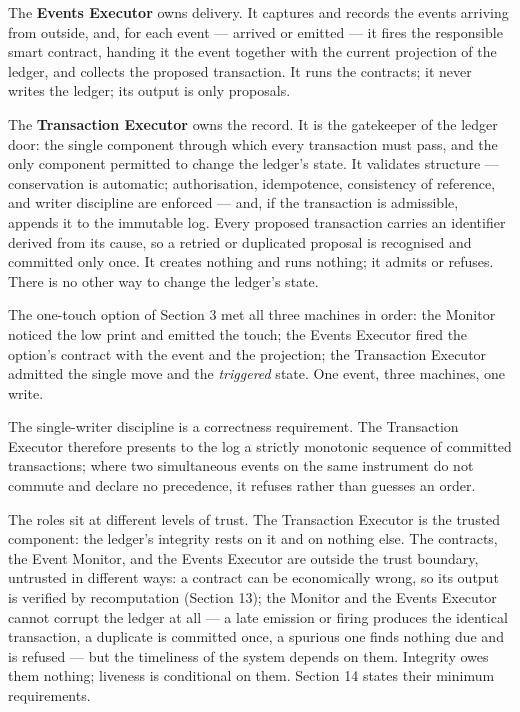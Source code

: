 \documentclass[11pt,a4paper]{article}
\newcommand{\clabel}[1]{\leavevmode\hypertarget{clause-#1}{}%
  \marginpar{\raggedright\scriptsize\ttfamily\textcolor{gray}{#1}}}
\begin{document}
\clabel{C-5.4}The \textbf{Events Executor} owns delivery. It captures and records the
events arriving from outside, and, for each event --- arrived or emitted
--- it fires the responsible smart contract, handing it the event
together with the current projection of the ledger, and collects the
proposed transaction. It runs the contracts; it never writes the ledger;
its output is only proposals.

\clabel{C-5.5}The \textbf{Transaction Executor} owns the record. It is the gatekeeper
of the ledger door: the single component through which every transaction
must pass, and the only component permitted to change the ledger's
state. It validates structure --- conservation is automatic;
authorisation, idempotence, consistency of reference, and writer
discipline are enforced --- and, if the transaction is admissible,
appends it to the immutable log. \clabel{C-5.6}Every proposed transaction carries an
identifier derived from its cause, so a retried or duplicated proposal
is recognised and committed only once. It creates nothing and runs
nothing; it admits or refuses. There is no other way to change the
ledger's state.

The one-touch option of Section 3 met all three machines in order: the
Monitor noticed the low print and emitted the touch; the Events Executor
fired the option's contract with the event and the projection; the
Transaction Executor admitted the single move and the \emph{triggered}
state. One event, three machines, one write.

\clabel{C-5.7}The single-writer discipline is a correctness requirement. The
Transaction Executor therefore presents to the log a strictly monotonic
sequence of committed transactions; where two simultaneous events on the
same instrument do not commute and declare no precedence, it refuses
rather than guesses an order.

\clabel{C-5.8}The roles sit at different levels of trust. The Transaction Executor is
the trusted component: the ledger's integrity rests on it and on nothing
else. The contracts, the Event Monitor, and the Events Executor are
outside the trust boundary, untrusted in different ways: a contract can
be economically wrong, so its output is verified by recomputation
(Section 13); the Monitor and the Events Executor cannot corrupt the
ledger at all --- a late emission or firing produces the identical
transaction, a duplicate is committed once, a spurious one finds nothing
due and is refused --- but the timeliness of the system depends on them.
Integrity owes them nothing; liveness is conditional on them. Section 14
states their minimum requirements.
\end{document}
